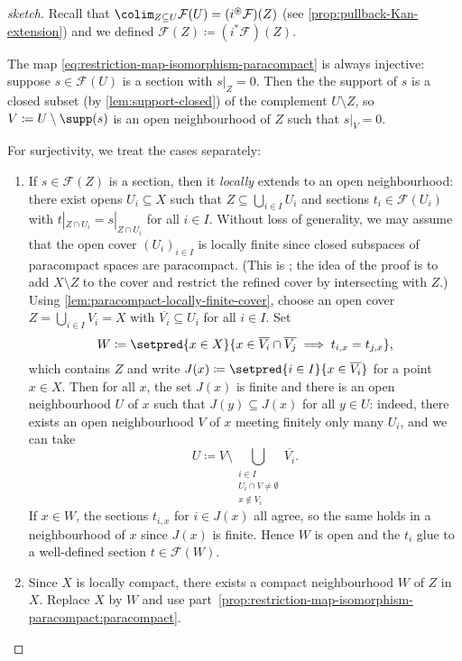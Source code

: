 \begin{proof}[sketch]
Recall that \(\colim_{Z\subseteq U}\mathcal F(U)=(i^\circledast\mathcal F)(Z)\) (see \cref{prop:pullback-Kan-extension}) and we defined \(\mathcal F(Z)\coloneq(i^*\mathcal F)(Z)\).

The map \cref{eq:restriction-map-isomorphism-paracompact} is always injective: suppose \(s\in\mathcal F(U)\) is a section with \(s|_Z=0\).
Then the the support of \(s\) is a closed subset (by \cref{lem:support-closed}) of the complement \(U\setminus Z\), so \(V\coloneq U\setminus\supp(s)\) is an open neighbourhood of \(Z\) such that \(s|_V=0\).

For surjectivity, we treat the cases separately:
\begin{enumerate}
\item
  If \(s\in\mathcal F(Z)\) is a section, then it \emph{locally} extends to an open neighbourhood: there exist opens \(U_i\subseteq X\) such that \(Z\subseteq\bigcup_{i\in I}U_i\) and sections \(t_i\in\mathcal F(U_i)\) with \(t|_{Z\cap U_i}=s|_{Z\cap U_i}\) for all \(i\in I\).
  Without loss of generality, we may assume that the open cover \((U_i)_{i\in I}\) is locally finite since closed subspaces of paracompact spaces are paracompact.
  (This is \cite[Theorem~41.2]{MunkresTopology}; the idea of the proof is to add \(X\setminus Z\) to the cover and restrict the refined cover by intersecting with \(Z\).)
  Using \cref{lem:paracompact-locally-finite-cover}, choose an open cover \(Z=\bigcup_{i\in I}V_i=X\) with \(\overline{V_i}\subseteq U_i\) for all \(i\in I\).
  Set
  \[ W\coloneq\setpred{x\in X}{x\in\overline{V_i}\cap\overline{V_j}\implies t_{i,x}=t_{j,x}}\text{,} \]
  which contains \(Z\) and write \(J(x)\coloneq\setpred{i\in I}{x\in\overline{V_i}}\) for a point \(x\in X\).
  Then for all \(x\), the set \(J(x)\) is finite and there is an open neighbourhood \(U\) of \(x\) such that \(J(y)\subseteq J(x)\) for all \(y\in U\): indeed, there exists an open neighbourhood \(V\) of \(x\) meeting finitely only many \(U_i\), and we can take
  \[ U\coloneq V\setminus\bigcup_{\substack{i\in I \\ U_i\cap V\neq\emptyset \\ x\notin V_i}}\overline{V_i}\text{.} \]
  If \(x\in W\), the sections \(t_{i,x}\) for \(i\in J(x)\) all agree, so the same holds in a neighbourhood of \(x\) since \(J(x)\) is finite.
  Hence \(W\) is open and the \(t_i\) glue to a well-defined section \(t\in\mathcal F(W)\).
\item
  Since \(X\) is locally compact, there exists a compact neighbourhood \(W\) of \(Z\) in \(X\).
  Replace \(X\) by \(W\) and use part~\cref{prop:restriction-map-isomorphism-paracompact:paracompact}.
  \qedhere
\end{enumerate}
\end{proof}

